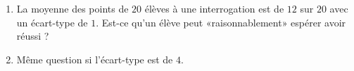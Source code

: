 
\begin{exercice}\label{exosmath-0243}

    \begin{enumerate}
        \item
    La moyenne des points de \( 20\) élèves à une interrogation est de \( 12\) sur \( 20\) avec un écart-type de \( 1\). Est-ce qu'un élève peut «raisonnablement» espérer avoir réussi ?
\item
    Même question si l'écart-type est de \( 4\).
    \end{enumerate}

\end{exercice}
